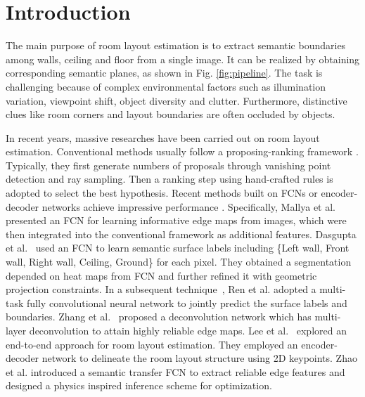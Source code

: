 \section{Introduction}
\label{sec:intro}

The main purpose of room layout estimation is to extract semantic boundaries among walls, ceiling and floor from a single image. It can be realized by obtaining corresponding semantic planes, as shown in Fig. \ref{fig:pipeline}. The task is challenging because of complex environmental factors such as illumination variation, viewpoint shift, object diversity and clutter. Furthermore, distinctive clues like room corners and layout boundaries are often occluded by objects. 

In recent years, massive researches have been carried out on room layout estimation. Conventional methods usually follow a proposing-ranking framework \cite{hedau2009recovering,wang2013discriminative,gupta2010estimating,hedau2010thinking}. Typically, they first generate numbers of proposals through vanishing point detection and ray sampling. Then a ranking step using hand-crafted rules is adopted to select the best hypothesis. Recent methods built on FCNs \cite{long2015fully} or encoder-decoder networks achieve impressive performance \cite{mallya2015learning,ren2016coarse,zhang2017learning,dasgupta2016delay,LeeRoomNet17,zhao2017physics}. Specifically, 
%
Mallya et al.~\cite{mallya2015learning} presented an FCN for learning informative edge maps from images, which were then integrated into the conventional framework as additional features. 
%
Dasgupta et al.~\cite{dasgupta2016delay} used an FCN to learn semantic surface labels including \{Left wall, Front wall, Right wall, Ceiling, Ground\} for each pixel. They obtained a segmentation depended on heat maps from FCN and further refined it with geometric projection constraints.
% 
In a subsequent technique~\cite{ren2016coarse}, Ren et al. adopted a multi-task fully convolutional neural network to jointly predict the surface labels and boundaries. 
%
Zhang et al.~\cite{zhang2017learning} proposed a deconvolution network which has multi-layer deconvolution to attain highly reliable edge maps. 
%
Lee et al.~\cite{LeeRoomNet17} explored an end-to-end approach for room layout estimation. They employed an encoder-decoder network to delineate the room layout structure using 2D keypoints.
%
Zhao et al. \cite{zhao2017physics} introduced a semantic transfer FCN to extract reliable edge features and designed a physics inspired inference scheme for optimization.


